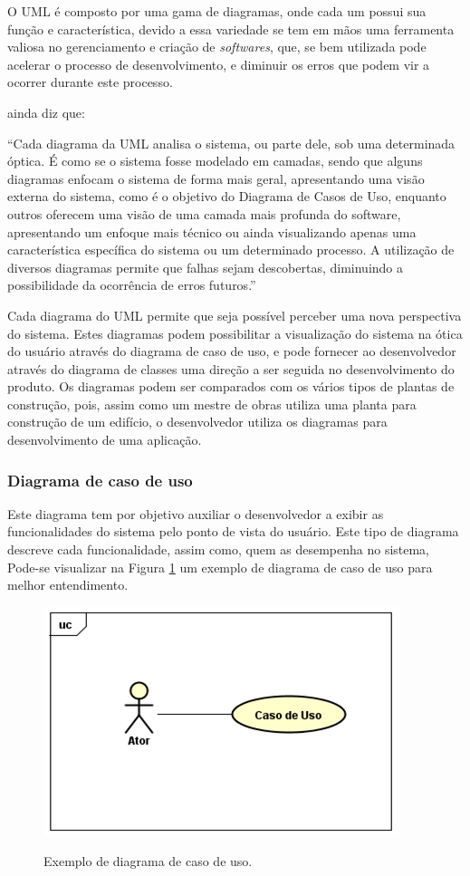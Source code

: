 \documentclass[
	12pt,				%
    oneside,			%
	a4paper,			%
	english,			%
	french,				%
	spanish,			%
	brazil,				%
	]{abntex2}
\begin{document}
	O UML é composto por uma gama de diagramas, onde cada um possui sua função e característica, devido a essa variedade se tem em mãos uma ferramenta valiosa no gerenciamento e criação de \textit{softwares}, que, se bem utilizada pode acelerar o processo de desenvolvimento, e diminuir os erros que podem vir a ocorrer durante este processo.
	 
	 ainda diz que:
	\begin{citacao}
		“Cada diagrama da UML analisa o sistema, ou parte dele, sob uma determinada óptica. É como se o sistema fosse modelado em camadas, sendo que alguns diagramas enfocam o sistema de forma mais geral, apresentando uma visão externa do sistema, como é o objetivo do Diagrama de Casos de Uso, enquanto outros oferecem uma visão de uma camada mais profunda do software, apresentando um enfoque mais técnico ou ainda visualizando apenas uma característica específica do sistema ou um determinado processo. A utilização de diversos diagramas permite que falhas sejam descobertas, diminuindo a possibilidade da ocorrência de erros futuros.”
	\end{citacao}
	
	Cada diagrama do UML permite que seja possível perceber uma nova perspectiva do sistema. Estes diagramas podem possibilitar a visualização do sistema na ótica do usuário através do diagrama de caso de uso, e pode fornecer ao desenvolvedor através do diagrama de classes uma direção a ser seguida no desenvolvimento do produto. Os diagramas podem ser comparados com os vários tipos de plantas de construção, pois, assim como um mestre de obras utiliza uma planta para construção de um edifício, o desenvolvedor utiliza os diagramas para desenvolvimento de uma aplicação.
	
		\subsubsection{Diagrama de caso de uso}
		
			Este diagrama tem por objetivo auxiliar o desenvolvedor a exibir as funcionalidades do sistema pelo ponto de vista do usuário. Este tipo de diagrama descreve cada funcionalidade, assim como, quem as desempenha no sistema, Pode-se visualizar na Figura \ref{fig:01} um exemplo de diagrama de caso de uso para melhor entendimento.
		
			\begin{figure} [hbt]
			\caption{Exemplo de diagrama de caso de uso.}
			\centering
			\includegraphics[width=0.7\linewidth]{Imagens/01}
			\label{fig:01}
			\end{figure}
		
\end{document}
